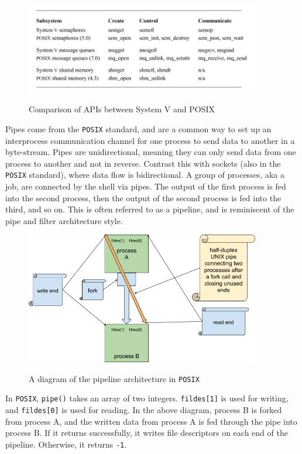 \documentclass[12pt, dvipsnames, a4paper]{article}
\newcommand{\code}[1]{\texttt{#1}}
\begin{document}
\newpage
\begin{figure}[hbt!]
	\centering
	\includegraphics[width=290pt]{assets/localipc1.png}
	\caption{Comparison of APIs between System V and POSIX} \cite{mckusick}
\end{figure}

Pipes come from the \code{POSIX} standard, and are a common way to set up an interprocess communication channel for one process to send data to another in a byte-stream. Pipes are unidirectional, meaning they can only send data from one process to another and not in reverse. Contrast this with sockets (also in the \code{POSIX} standard), where data flow is bidirectional. A group of processes, aka a job, are connected by the shell via pipes. The output of the first process is fed into the second process, then the output of the second process is fed into the third, and so on. This is often referred to as a pipeline, and is reminiscent of the pipe and filter architecture style.

\begin{figure}[hbt!]
	\centering
	\includegraphics[width=290pt]{assets/localipc2.png}
	\caption{A diagram of the pipeline architecture in \code{POSIX}} \cite{rytarowski}
\end{figure}

In \code{POSIX}, \code{pipe()} takes an array of two integers. \code{fildes[1]} is used for writing, and \code{fildes[0]} is used for reading. In the above diagram, process B is forked from process A, and the written data from process A is fed through the pipe into process B. If it returns successfully, it writes file descriptors on each end of the pipeline. Otherwise, it returns \code{-1}.
\end{document}
